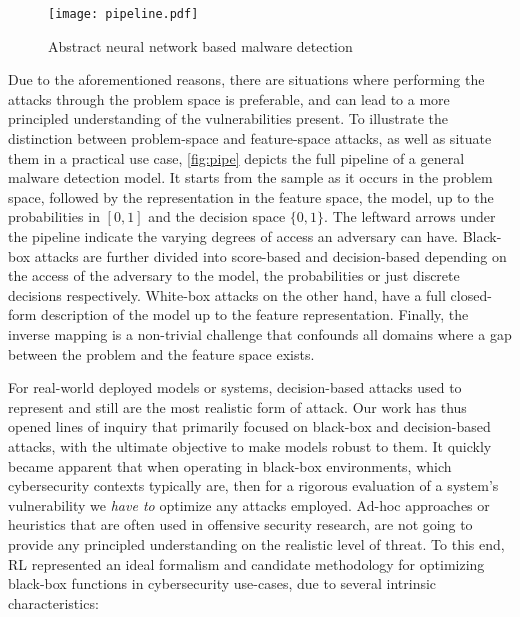 \begin{figure}
    \centering
    \texttt{[image: pipeline.pdf]}
    \caption{Abstract neural network based malware detection}
    \label{fig:pipe}
\end{figure}

Due to the aforementioned reasons, there are situations where performing the attacks through the problem space is preferable, and can lead to a more principled understanding of the vulnerabilities present.
To illustrate the distinction between problem-space and feature-space attacks, as well as situate them in a practical use case, \autoref{fig:pipe} depicts the full pipeline of a general malware detection model.
It starts from the sample as it occurs in the problem space, followed by the representation in the feature space, the model, up to the probabilities in $[0,1]$ and the decision space $\{0,1\}$.
The leftward arrows under the pipeline indicate the varying degrees of access an adversary can have.
Black-box attacks are further divided into score-based and decision-based depending on the access of the adversary to the model, the probabilities or just discrete decisions respectively.
White-box attacks on the other hand, have a full closed-form description of the model up to the feature representation.
Finally, the inverse mapping is a non-trivial challenge that confounds all domains where a gap between the problem and the feature space exists.

For real-world deployed models or systems, decision-based attacks used to represent and still are the most realistic form of attack.
Our work has thus opened lines of inquiry that primarily focused on black-box and decision-based attacks, with the ultimate objective to make models robust to them.
It quickly became apparent that when operating in black-box environments, which cybersecurity contexts typically are, then for a rigorous evaluation of a system's vulnerability we \textit{have to} optimize any attacks employed.
Ad-hoc approaches or heuristics that are often used in offensive security research, are not going to provide any principled understanding on the realistic level of threat.
To this end, \gls{RL} represented an ideal formalism and candidate methodology for optimizing black-box functions in cybersecurity use-cases, due to several intrinsic characteristics:

